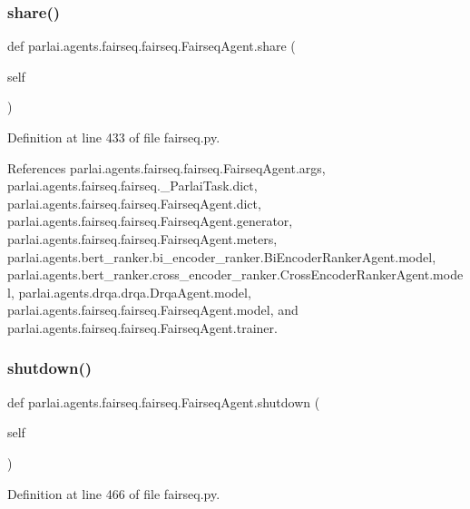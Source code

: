 \subsubsection{\texorpdfstring{share()}{share()}}
{\footnotesize\ttfamily def parlai.\+agents.\+fairseq.\+fairseq.\+Fairseq\+Agent.\+share (\begin{DoxyParamCaption}\item[{}]{self }\end{DoxyParamCaption})}



Definition at line 433 of file fairseq.\+py.



References parlai.\+agents.\+fairseq.\+fairseq.\+Fairseq\+Agent.\+args, parlai.\+agents.\+fairseq.\+fairseq.\+\_\+\+Parlai\+Task.\+dict, parlai.\+agents.\+fairseq.\+fairseq.\+Fairseq\+Agent.\+dict, parlai.\+agents.\+fairseq.\+fairseq.\+Fairseq\+Agent.\+generator, parlai.\+agents.\+fairseq.\+fairseq.\+Fairseq\+Agent.\+meters, parlai.\+agents.\+bert\+\_\+ranker.\+bi\+\_\+encoder\+\_\+ranker.\+Bi\+Encoder\+Ranker\+Agent.\+model, parlai.\+agents.\+bert\+\_\+ranker.\+cross\+\_\+encoder\+\_\+ranker.\+Cross\+Encoder\+Ranker\+Agent.\+model, parlai.\+agents.\+drqa.\+drqa.\+Drqa\+Agent.\+model, parlai.\+agents.\+fairseq.\+fairseq.\+Fairseq\+Agent.\+model, and parlai.\+agents.\+fairseq.\+fairseq.\+Fairseq\+Agent.\+trainer.

\mbox{\label{classparlai_1_1agents_1_1fairseq_1_1fairseq_1_1FairseqAgent_a76856ecae016691ada6f7187d6aa744a}} 
\subsubsection{\texorpdfstring{shutdown()}{shutdown()}}
{\footnotesize\ttfamily def parlai.\+agents.\+fairseq.\+fairseq.\+Fairseq\+Agent.\+shutdown (\begin{DoxyParamCaption}\item[{}]{self }\end{DoxyParamCaption})}



Definition at line 466 of file fairseq.\+py.



